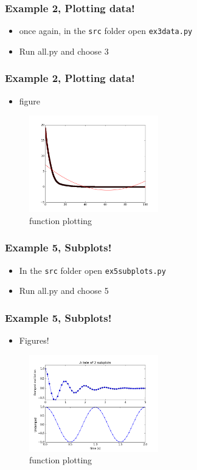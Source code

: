 \documentclass{beamer}
\begin{document}
\begin{frame}
\frametitle{Example 2, Plotting data!}
\begin{itemize}
	\item once again, in the \texttt{src} folder open \texttt{ex3data.py}
	\item Run all.py and choose 3 
\end{itemize}
\end{frame}

\begin{frame}
\frametitle{Example 2, Plotting data!}
\begin{itemize}
	\item figure 
\end{itemize}
\begin{figure}
	\centering
	\includegraphics[width=0.5\textwidth]{ex3.png}
	\caption{function plotting}
	\label{fig:function}
\end{figure}
\end{frame}



\begin{frame}
\frametitle{Example 5, Subplots!}
\begin{itemize}
\item In the \texttt{src} folder open \texttt{ex5subplots.py} 
	\item Run all.py and choose 5 
\end{itemize}
\end{frame}

\begin{frame}
\frametitle{Example 5, Subplots!}
\begin{itemize}
\item Figures!
\end{itemize}
\begin{figure}
	\centering
	\includegraphics[width=0.5\textwidth]{ex5.png}
	\caption{function plotting}
	\label{fig:function}
\end{figure}
\end{frame}
\end{document}
